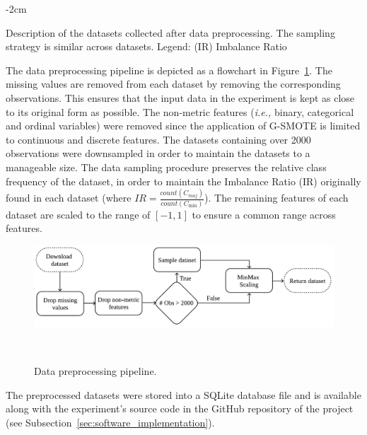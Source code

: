 \documentclass[parskip=full]{scrartcl}
\begin{document}
\begin{table}[H]
    \centering
    \addtolength{\leftskip} {-2cm}
    \addtolength{\rightskip}{-2cm}
    \caption{\label{tab:datasets_description}
        Description of the datasets collected after data preprocessing. The
        sampling strategy is similar across datasets. Legend: (IR) Imbalance
        Ratio
    }
\end{table}

The data preprocessing pipeline is depicted as a flowchart in
Figure~\ref{fig:data_preprocessing}. The missing values are removed from each
dataset by removing the corresponding observations. This ensures that the
input data in the experiment is kept as close to its original form as
possible. The non-metric features (\textit{i.e.,} binary, categorical and
ordinal variables) were removed since the application of G-SMOTE is limited to
continuous and discrete features. The datasets containing over 2000
observations were downsampled in order to maintain the datasets to a
manageable size. The data sampling procedure preserves the relative class
frequency of the dataset, in order to maintain the Imbalance Ratio (IR)
originally found in each dataset (where $IR =
\frac{count(C_{maj})}{count(C_{\min})}$). The remaining features of each
dataset are scaled to the range of $[-1, 1]$ to ensure a common range across
features.

\begin{figure}[H]
	\centering
	\includegraphics[width=1\linewidth]{../analysis/data_preprocessing}
    \caption{%
        Data preprocessing pipeline.
    }~\label{fig:data_preprocessing}
\end{figure}

The preprocessed datasets were stored into a SQLite database file and is
available along with the experiment's source code in the GitHub repository of
the project (see Subsection~\ref{sec:software_implementation}).
\end{document}
